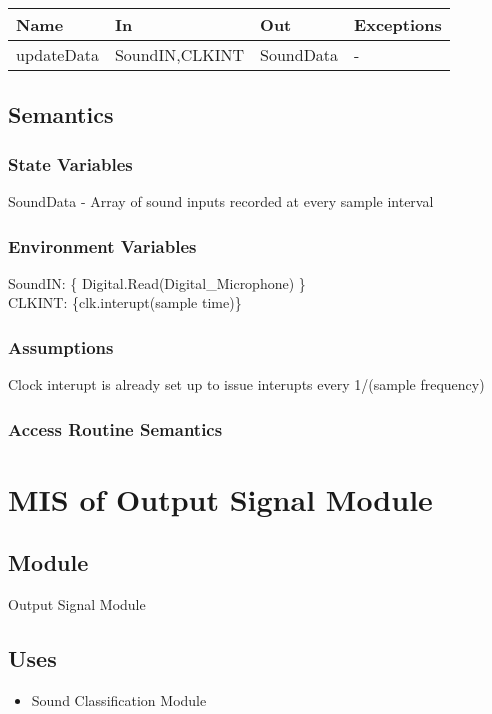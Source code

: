 \documentclass[12pt, titlepage]{article}
\begin{document}
\begin{center}
\begin{tabular}{p{2cm} p{4cm} p{4cm} p{2cm}}
\hline
\textbf{Name} & \textbf{In} & \textbf{Out} & \textbf{Exceptions} \\
\hline
updateData & SoundIN,CLKINT & SoundData & - \\
\hline
\end{tabular}
\end{center}

\subsection{Semantics}

\subsubsection{State Variables}

SoundData - Array of sound inputs recorded at every sample interval

\subsubsection{Environment Variables}

SoundIN: \{ Digital.Read(Digital\_Microphone) \}\\
CLKINT: \{clk.interupt(sample time)\}

\subsubsection{Assumptions}

Clock interupt is already set up to issue interupts every 1/(sample frequency) 

\subsubsection{Access Routine Semantics}
\newpage 

\section{MIS of Output Signal Module} \label{Output Signal Module}
\subsection{Module}
Output Signal Module
\subsection{Uses}
\begin{itemize}
  \item Sound Classification Module
  \end{itemize}
\end{document}
